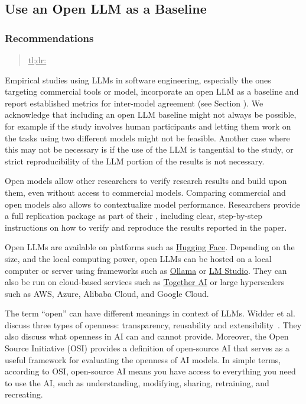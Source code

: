 



\subsection{Use an Open LLM as a Baseline}

\subsubsection{Recommendations}

\begin{quote}
\underline{tl;dr:} 
\end{quote}

Empirical studies using LLMs in software engineering, especially the ones targeting commercial tools or model, \should incorporate an open LLM as a baseline and report established metrics for inter-model agreement (see Section \benchmarksmetrics).
We acknowledge that including an open LLM baseline might not always be possible, for example if the study involves human participants and letting them work on the tasks using two different models might not be feasible. Another case where this may not be necessary is if the use of the LLM is tangential to the study, or strict reproducibility of the LLM portion of the results is not necessary.

Open models allow other researchers to verify research results and build upon them, even without access to commercial models.
Comparing commercial and open models also allows to contextualize model performance.
Researchers \should provide a full replication package as part of their \supplementarymaterial, including clear, step-by-step instructions on how to verify and reproduce the results reported in the paper.

Open LLMs are available on platforms such as \href{https://huggingface.co/}{Hugging Face}.
Depending on the size, and the local computing power, open LLMs can be hosted on a local computer or server using frameworks such as \href{https://ollama.com/}{Ollama} or \href{https://lmstudio.ai/}{LM Studio}.
They can also be run on cloud-based services such as \href{https://together.ai/}{Together AI} or large hyperscalers such as AWS, Azure, Alibaba Cloud, and Google Cloud.

The term ``open'' can have different meanings in context of LLMs.
Widder et al. discuss three types of openness: transparency, reusability and extensibility~\cite{widder2024open}.
They also discuss what openness in AI can and cannot provide.
Moreover, the Open Source Initiative (OSI) \cite{OSIAI2024} provides a definition of open-source AI that serves as a useful framework for evaluating the openness of AI models.
In simple terms, according to OSI, open-source AI means  you have access to everything you need to use the AI, such as understanding, modifying, sharing, retraining, and recreating.


